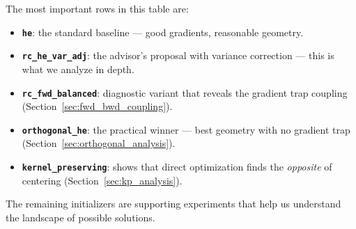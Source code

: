 \begin{remark}
The most important rows in this table are:
\begin{itemize}
  \item \textbf{\texttt{he}}: the standard baseline --- good gradients,
        reasonable geometry.
  \item \textbf{\texttt{rc\_he\_var\_adj}}: the advisor's proposal
        with variance correction --- this is what we analyze in depth.
  \item \textbf{\texttt{rc\_fwd\_balanced}}: diagnostic variant that
        reveals the gradient trap coupling (Section~\ref{sec:fwd_bwd_coupling}).
  \item \textbf{\texttt{orthogonal\_he}}: the practical winner ---
        best geometry with no gradient trap
        (Section~\ref{sec:orthogonal_analysis}).
  \item \textbf{\texttt{kernel\_preserving}}: shows that direct
        optimization finds the \emph{opposite} of centering
        (Section~\ref{sec:kp_analysis}).
\end{itemize}
The remaining initializers are supporting experiments that help us
understand the landscape of possible solutions.
\end{remark}

